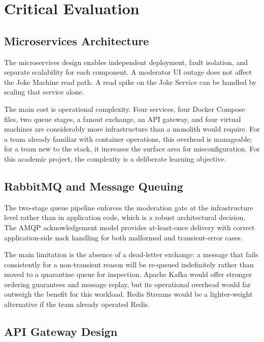 \documentclass[12pt,a4paper]{article}
\begin{document}
\section{Critical Evaluation}

\subsection{Microservices Architecture}

The microservices design enables independent deployment, fault isolation, and separate scalability for each component. A moderator UI outage does not affect the Joke Machine read path. A read spike on the Joke Service can be handled by scaling that service alone.

The main cost is operational complexity. Four services, four Docker Compose files, two queue stages, a fanout exchange, an API gateway, and four virtual machines are considerably more infrastructure than a monolith would require. For a team already familiar with container operations, this overhead is manageable; for a team new to the stack, it increases the surface area for misconfiguration. For this academic project, the complexity is a deliberate learning objective.

\subsection{RabbitMQ and Message Queuing}

The two-stage queue pipeline enforces the moderation gate at the infrastructure level rather than in application code, which is a robust architectural decision. The AMQP acknowledgement model provides at-least-once delivery with correct application-side nack handling for both malformed and transient-error cases.

The main limitation is the absence of a dead-letter exchange: a message that fails consistently for a non-transient reason will be re-queued indefinitely rather than moved to a quarantine queue for inspection. Apache Kafka would offer stronger ordering guarantees and message replay, but its operational overhead would far outweigh the benefit for this workload. Redis Streams would be a lighter-weight alternative if the team already operated Redis.

\subsection{API Gateway Design}
\end{document}
